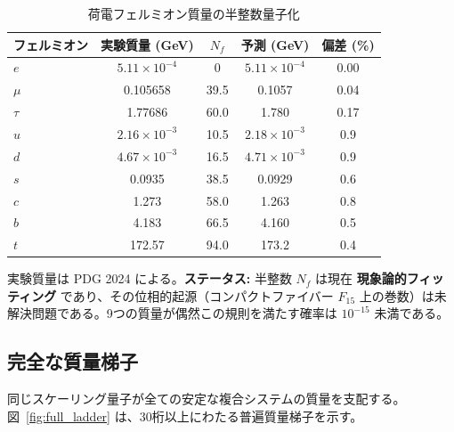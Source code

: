\documentclass[12pt,a4paper]{article}
\begin{document}
	\begin{table}[htbp]
		\centering
		\caption{荷電フェルミオン質量の半整数量子化}
		\label{tab:fermions}
		\begin{tabular}{l c c c c}
			\toprule
			フェルミオン & 実験質量 (GeV) & \(N_f\) & 予測 (GeV) & 偏差 (\%) \\
			\midrule
			\(e\)   & \(5.11\times10^{-4}\) & 0      & \(5.11\times10^{-4}\) & 0.00 \\
			\(\mu\)  & 0.105658             & 39.5   & 0.1057               & 0.04 \\
			\(\tau\) & 1.77686              & 60.0   & 1.780                & 0.17 \\
			\(u\)   & \(2.16\times10^{-3}\) & 10.5   & \(2.18\times10^{-3}\) & 0.9 \\
			\(d\)   & \(4.67\times10^{-3}\) & 16.5   & \(4.71\times10^{-3}\) & 0.9 \\
			\(s\)   & 0.0935               & 38.5   & 0.0929               & 0.6 \\
			\(c\)   & 1.273                & 58.0   & 1.263                & 0.8 \\
			\(b\)   & 4.183                & 66.5   & 4.160                & 0.5 \\
			\(t\)   & 172.57               & 94.0   & 173.2                & 0.4 \\
			\bottomrule
		\end{tabular}
		\par\smallskip
		\footnotesize
		実験質量は PDG 2024 による。\textbf{ステータス:} 半整数 \(N_f\) は現在 \textbf{現象論的フィッティング} であり、その位相的起源（コンパクトファイバー \(F_{15}\) 上の巻数）は未解決問題である。9つの質量が偶然この規則を満たす確率は \(10^{-15}\) 未満である。
	\end{table}
	
	\subsection{完全な質量梯子}
	
	同じスケーリング量子が全ての安定な複合システムの質量を支配する。図~\ref{fig:full_ladder} は、30桁以上にわたる普遍質量梯子を示す。
	
\end{document}
